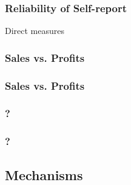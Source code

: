\documentclass[hideothersubsections, usenames,dvipsnames,10pt]{beamer}
\newenvironment{itemize_3pt}{\itemize\addtolength{\itemsep}{3pt}}{\enditemize}
\begin{document}
\begin{frame}
\frametitle{Reliability of Self-report}
	\begin{itemize_3pt}
	\item Direct measures \citep{deMel2009}
	\vspace{0.1in}
	\end{itemize_3pt}
\end{frame}


\begin{frame}
\frametitle{Sales vs. Profits}
	\begin{itemize_3pt}
	\item  \citep{deMel2009}
	\vspace{0.1in}
	\end{itemize_3pt}
\end{frame}

\begin{frame}
\frametitle{Sales vs. Profits}
	\begin{itemize_3pt}
	\item \citep{deMel2009}
	\vspace{0.1in}
	\end{itemize_3pt}
\end{frame}


\begin{frame}
\frametitle{?}
	\begin{itemize_3pt}
	\item 
	\vspace{0.1in}
	\end{itemize_3pt}
\end{frame}

\begin{frame}
\frametitle{?}
	\begin{itemize_3pt}
	\item 
	\vspace{0.1in}
	\end{itemize_3pt}
\end{frame}


\subsection{Mechanisms}
\end{document}
